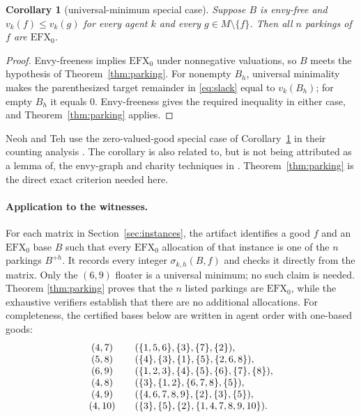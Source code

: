 \documentclass[11pt]{article}
\theoremstyle{plain}
\newtheorem{corollary}[theorem]{Corollary}
\theoremstyle{definition}
\newcommand{\efxo}{\mathrm{EFX}_0}
\begin{document}
\begin{corollary}[universal-minimum special case]\label{cor:universal}
Suppose $B$ is envy-free and $v_k(f)\le v_k(g)$ for every agent $k$ and every
$g\in M\setminus\{f\}$.  Then all $n$ parkings of $f$ are $\efxo$.
\end{corollary}

\begin{proof}
Envy-freeness implies $\efxo$ under nonnegative valuations, so $B$ meets the
hypothesis of Theorem~\ref{thm:parking}.
For nonempty $B_h$, universal minimality makes the parenthesized target
remainder in \eqref{eq:slack} equal to $v_k(B_h)$; for empty $B_h$ it equals
$0$.  Envy-freeness gives the required inequality in either case, and
Theorem~\ref{thm:parking} applies.
\end{proof}

Neoh and Teh use the zero-valued-good special case of
Corollary~\ref{cor:universal} in their counting analysis
\cite{NeohTeh2025}.  The corollary is also related to, but is not being
attributed as a lemma of, the envy-graph and charity techniques in
\cite{Lipton2004,CGM2019,Berger2022}.  Theorem~\ref{thm:parking} is the direct
exact criterion needed here.

\paragraph{Application to the witnesses.}
For each matrix in Section~\ref{sec:instances}, the artifact identifies a good
$f$ and an $\efxo$ base $B$ such that every $\efxo$ allocation of that instance is one
of the $n$ parkings $B^{+h}$.  It records every integer
$\sigma_{k,h}(B,f)$ and checks it directly from the matrix.  Only the $(6,9)$
floater is a universal minimum; no such claim is needed.  Theorem
\ref{thm:parking} proves that the $n$ listed parkings are $\efxo$, while the
exhaustive verifiers establish that there are no additional allocations.
For completeness, the certified bases below are written in agent order with
one-based goods:
\[
\begin{array}{c@{\qquad}l}
(4,7)  & (\{1,5,6\},\{3\},\{7\},\{2\}),\\
(5,8)  & (\{4\},\{3\},\{1\},\{5\},\{2,6,8\}),\\
(6,9)  & (\{1,2,3\},\{4\},\{5\},\{6\},\{7\},\{8\}),\\
(4,8)  & (\{3\},\{1,2\},\{6,7,8\},\{5\}),\\
(4,9)  & (\{4,6,7,8,9\},\{2\},\{3\},\{5\}),\\
(4,10) & (\{3\},\{5\},\{2\},\{1,4,7,8,9,10\}).
\end{array}
\]
\end{document}
